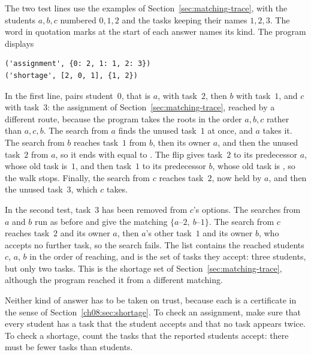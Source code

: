 The two test lines use the examples of Section~\ref{sec:matching-trace}, with the students $a,b,c$ numbered $0,1,2$ and the tasks keeping their names $1,2,3$. The word in quotation marks at the start of each answer names its kind. The program displays
\par\noindent\begin{minipage}{\linewidth}
\begin{lstlisting}
('assignment', {0: 2, 1: 1, 2: 3})
('shortage', [2, 0, 1], {1, 2})
\end{lstlisting}
\end{minipage}\par
In the first line,  pairs student~$0$, that is $a$, with task~$2$, then $b$ with task~$1$, and $c$ with task~$3$: the assignment of Section~\ref{sec:matching-trace}, reached by a different route, because the program takes the roots in the order $a,b,c$ rather than $a,c,b$. The search from $a$ finds the unused task~$1$ at once, and $a$ takes it. The search from $b$ reaches task~$1$ from $b$, then its owner $a$, and then the unused task~$2$ from $a$, so it ends with  equal to . The flip gives task~$2$ to its predecessor $a$, whose old task is~$1$, and then task~$1$ to its predecessor $b$, whose old task is , so the walk stops. Finally, the search from $c$ reaches task~$2$, now held by $a$, and then the unused task~$3$, which $c$ takes.

In the second test, task~$3$ has been removed from $c$'s options. The searches from $a$ and $b$ run as before and give the matching $\{a\text{--}2,\ b\text{--}1\}$. The search from $c$ reaches task~$2$ and its owner $a$, then $a$'s other task~$1$ and its owner $b$, who accepts no further task, so the search fails. The list \code{[2, 0, 1]} contains the reached students $c$, $a$, $b$ in the order of reaching, and  is the set of tasks they accept: three students, but only two tasks. This is the shortage set of Section~\ref{sec:matching-trace}, although the program reached it from a different matching.

Neither kind of answer has to be taken on trust, because each is a certificate in the sense of Section~\ref{ch08:sec:shortage}. To check an assignment, make sure that every student has a task that the student accepts and that no task appears twice. To check a shortage, count the tasks that the reported students accept: there must be fewer tasks than students.


